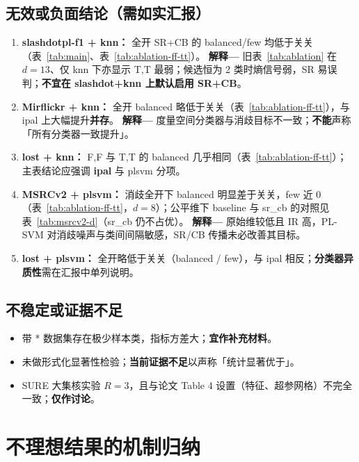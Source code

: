 \documentclass[11pt,a4paper]{article}
\begin{document}
\subsection{无效或负面结论（需如实汇报）}
\begin{enumerate}
  \item \textbf{slashdotpl-f1 + knn：} 全开 SR+CB 的 balanced/few 均低于关关（表~\ref{tab:main}、表~\ref{tab:ablation-ff-tt}）。
  \textbf{解释—} 旧表~\ref{tab:ablation} 在 $d{=}13$、仅 knn 下亦显示 T,T 最弱；候选恒为 2 类时熵信号弱，SR 易误判；\textbf{不宜在 slashdot+knn 上默认启用 SR+CB}。

  \item \textbf{Mirflickr + knn：} 全开 balanced 略低于关关（表~\ref{tab:ablation-ff-tt}），与 ipal 上大幅提升\textbf{并存}。
  \textbf{解释—} 度量空间分类器与消歧目标不一致；\textbf{不能}声称「所有分类器一致提升」。

  \item \textbf{lost + knn：} F,F 与 T,T 的 balanced 几乎相同（表~\ref{tab:ablation-ff-tt}）；主表结论应强调 \textbf{ipal} 与 plsvm 分项。

  \item \textbf{MSRCv2 + plsvm：} 消歧全开下 balanced 明显差于关关，few 近 $0$（表~\ref{tab:ablation-ff-tt}，$d{=}8$）；公平维下 baseline 与 sr\_cb 的对照见表~\ref{tab:msrcv2-d}（sr\_cb 仍不占优）。
  \textbf{解释—} 原始维较低且 IR 高，PL-SVM 对消歧噪声与类间间隔敏感，SR/CB 传播未必改善其目标。

  \item \textbf{lost + plsvm：} 全开略低于关关（balanced / few），与 ipal 相反；\textbf{分类器异质性}需在汇报中单列说明。
\end{enumerate}

\subsection{不稳定或证据不足}
\begin{itemize}
  \item 带 * 数据集存在极少样本类，指标方差大；\textbf{宜作补充材料}。
  \item 未做形式化显著性检验；\textbf{当前证据不足}以声称「统计显著优于」。
  \item SURE 大集核实验 $R{=}3$，且与论文 Table 4 设置（特征、超参网格）不完全一致；\textbf{仅作讨论}。
\end{itemize}

\section{不理想结果的机制归纳}
\end{document}
